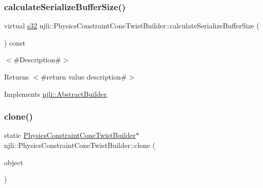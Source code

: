 \mbox{\label{classnjli_1_1_physics_constraint_cone_twist_builder_ae42ec507a3f9af68faf77ab90b77a97a}} 
\subsubsection{\texorpdfstring{calculate\+Serialize\+Buffer\+Size()}{calculateSerializeBufferSize()}}
{\footnotesize\ttfamily virtual \mbox{\hyperlink{_util_8h_aa62c75d314a0d1f37f79c4b73b2292e2}{s32}} njli\+::\+Physics\+Constraint\+Cone\+Twist\+Builder\+::calculate\+Serialize\+Buffer\+Size (\begin{DoxyParamCaption}{ }\end{DoxyParamCaption}) const\hspace{0.3cm}{\ttfamily [virtual]}}

$<$\#\+Description\#$>$

\begin{DoxyReturn}{Returns}
$<$\#return value description\#$>$ 
\end{DoxyReturn}


Implements \mbox{\hyperlink{classnjli_1_1_abstract_builder_aa1d220053e182c37b31b427499c6eacf}{njli\+::\+Abstract\+Builder}}.

\mbox{\label{classnjli_1_1_physics_constraint_cone_twist_builder_aa7f25dc4ccc5e3c9f65bd8f88dcd45a3}} 
\subsubsection{\texorpdfstring{clone()}{clone()}}
{\footnotesize\ttfamily static \mbox{\hyperlink{classnjli_1_1_physics_constraint_cone_twist_builder}{Physics\+Constraint\+Cone\+Twist\+Builder}}$\ast$ njli\+::\+Physics\+Constraint\+Cone\+Twist\+Builder\+::clone (\begin{DoxyParamCaption}\item[{const \mbox{\hyperlink{classnjli_1_1_physics_constraint_cone_twist_builder}{Physics\+Constraint\+Cone\+Twist\+Builder}} \&}]{object }\end{DoxyParamCaption})\hspace{0.3cm}{\ttfamily [static]}}

